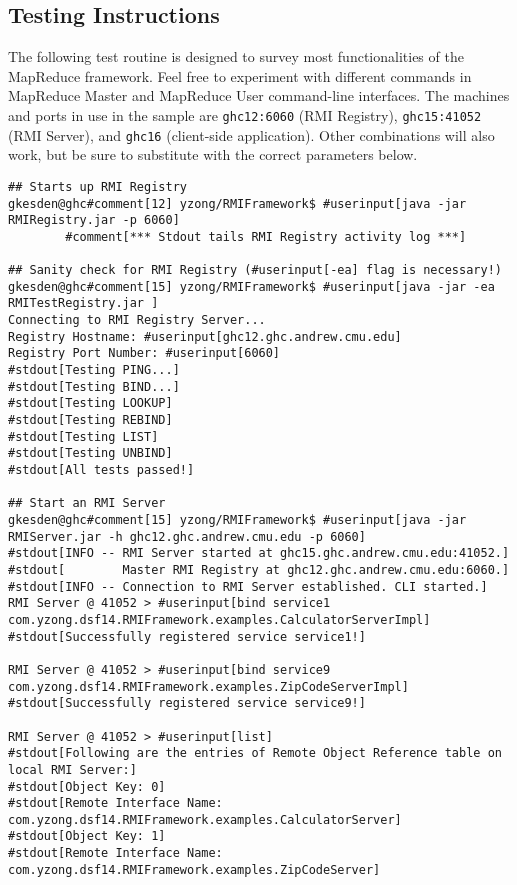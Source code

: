 \documentclass{article} %
\begin{document}
\subsection{Testing Instructions}

\par\qquad The following test routine is designed to survey most functionalities of the MapReduce framework. Feel free to experiment with different commands in MapReduce Master and MapReduce User command-line interfaces. The machines and ports in use in the sample are \texttt{ghc12:6060} (RMI Registry), \texttt{ghc15:41052} (RMI Server), and \texttt{ghc16} (client-side application). Other combinations will also work, but be sure to substitute with the correct parameters below.

{\small
\begin{Verbatim}[fontsize=\small, xleftmargin=-.5in,commandchars=\#\[\]]
## Starts up RMI Registry
gkesden@ghc#comment[12] yzong/RMIFramework$ #userinput[java -jar RMIRegistry.jar -p 6060]
        #comment[*** Stdout tails RMI Registry activity log ***]

## Sanity check for RMI Registry (#userinput[-ea] flag is necessary!)
gkesden@ghc#comment[15] yzong/RMIFramework$ #userinput[java -jar -ea RMITestRegistry.jar ]
Connecting to RMI Registry Server...
Registry Hostname: #userinput[ghc12.ghc.andrew.cmu.edu]
Registry Port Number: #userinput[6060]
#stdout[Testing PING...]
#stdout[Testing BIND...]
#stdout[Testing LOOKUP]
#stdout[Testing REBIND]
#stdout[Testing LIST]
#stdout[Testing UNBIND]
#stdout[All tests passed!]

## Start an RMI Server
gkesden@ghc#comment[15] yzong/RMIFramework$ #userinput[java -jar RMIServer.jar -h ghc12.ghc.andrew.cmu.edu -p 6060]
#stdout[INFO -- RMI Server started at ghc15.ghc.andrew.cmu.edu:41052.]
#stdout[        Master RMI Registry at ghc12.ghc.andrew.cmu.edu:6060.]
#stdout[INFO -- Connection to RMI Server established. CLI started.]
RMI Server @ 41052 > #userinput[bind service1 com.yzong.dsf14.RMIFramework.examples.CalculatorServerImpl]
#stdout[Successfully registered service service1!]

RMI Server @ 41052 > #userinput[bind service9 com.yzong.dsf14.RMIFramework.examples.ZipCodeServerImpl]
#stdout[Successfully registered service service9!]

RMI Server @ 41052 > #userinput[list]
#stdout[Following are the entries of Remote Object Reference table on local RMI Server:]
#stdout[Object Key: 0]
#stdout[Remote Interface Name: com.yzong.dsf14.RMIFramework.examples.CalculatorServer]
#stdout[Object Key: 1]
#stdout[Remote Interface Name: com.yzong.dsf14.RMIFramework.examples.ZipCodeServer]


\end{Verbatim}}
\end{document}
